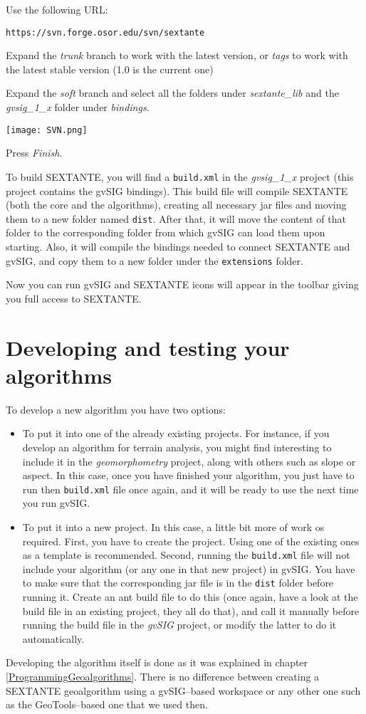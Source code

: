 Use the following URL:

\begin{verbatim}
https://svn.forge.osor.edu/svn/sextante
\end{verbatim}

Expand the \emph{trunk} branch to work with the latest version, or \emph{tags} to work with the latest stable version (1.0 is the current one)

Expand the \emph{soft} branch and select all the folders under \emph{sextante\_lib} and the \emph{gvsig\_1\_x} folder under \emph{bindings}. 

\begin{center}
 \texttt{[image: SVN.png]} 
\end{center}

Press \emph{Finish}.

To build SEXTANTE, you will find a \texttt{build.xml} in the \emph{gvsig\_1\_x} project (this project contains the gvSIG bindings). This build file will compile SEXTANTE (both the core and the algorithms), creating all necessary jar files and moving them to a new folder named \texttt{dist}. After that, it will move the content of that folder to the corresponding folder from which gvSIG can load them upon starting.  Also, it will compile the bindings needed to connect SEXTANTE and gvSIG, and copy them to a new folder under the \texttt{extensions} folder.

Now you can run gvSIG and SEXTANTE icons will appear in the toolbar giving you full access to SEXTANTE. 

\section{Developing and testing your algorithms}

To develop a new algorithm you have two options:

\begin{itemize}
	\item To put it into one of the already existing projects. For instance, if you develop an algorithm for terrain analysis, you might find interesting to include it in the \emph{geomorphometry} project, along with others such as slope or aspect. In this case, once you have finished your algorithm, you just have to run then \texttt{build.xml} file once again, and it will be ready to use the next time you run gvSIG.
	\item To put it into a new project. In this case, a little bit more of work os required. First, you have to create the project. Using one of the existing ones as a template is recommended. Second, running the \texttt{build.xml} file will not include your algorithm (or any one in that new project) in gvSIG. You have to make sure that the corresponding jar file is in the \texttt{dist} folder before running it. Create an ant build file to do this (once again, have a look at the build file in an existing project, they all do that), and call it manually before running the build file in the \emph{gvSIG} project, or modify the latter to do it automatically.
\end{itemize}

Developing the algorithm itself is done as it was explained in chapter \ref{ProgrammingGeoalgorithms}. There is no difference between creating a SEXTANTE geoalgorithm using a gvSIG--based workspace or any other one such as the GeoTools--based one that we used then.